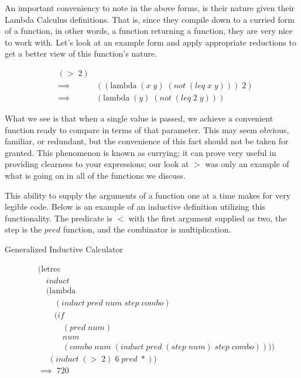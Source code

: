 An important conveniency to note in the above forms, is their nature given their 
Lambda Calculus definitions. That is, since they compile down to a curried form of 
a function, in other words, a function returning a function, they are very nice to 
work with. Let's look at an example form and apply appropriate reductions to get a 
better view of this function's nature.

\begin{figure}[ht]
\caption{}\label{scheme}
\begin{align*}
& (> \; 2)
\\& \implies \; &((\text{lambda} \; (x \; y) \; (not \; (leq \; x \; y))) \; 2)
\\& \implies \; &(\text{lambda} \; (y) \; (not \; (leq \; 2 \; y))) \; 
\end{align*}
\end{figure}

What we see is that when a single value is passed, we achieve a convenient 
function ready to compare in terms of that parameter. This may seem obvious, 
familiar, or redundant, but the convenience of this fact should not be taken for 
granted. This phenomenon is known as currying; it can prove very useful in 
providing clearness to your expressions; our look at $>$ was only an example of 
what is going on in all of the functions we discuss.

This ability to supply the arguments of a function one at a time makes for very 
legible code. Below is an example of an inductive definition utilizing this 
functionality. The predicate is $<$ with the first argument supplied as two, the 
step is the $pred$ function, and the combinator is multiplication.

Generalized Inductive Calculator
\begin{figure}[ht]
\caption{}\label{scheme}
\begin{align*}
& (\text{letrec} \; 
\\& \quad induct \; 
\\& \quad (\text{lambda} \; 
\\& \qquad (induct \; pred \; num \; step \; combo) \; 
\\& \qquad (if \; 
\\& \qquad \quad (pred \; num) \; 
\\& \qquad \quad num \; 
\\& \qquad \quad (combo \; num \; (induct \; pred \; (step \; num) \; step \; combo)))) \; 
\\& \quad \; (induct \; (> \; 2) \; 6 \; pred \; *))
\\& \implies \; 720
\end{align*}
\end{figure}

